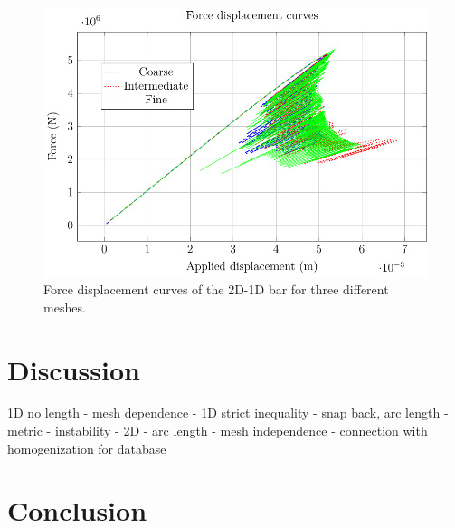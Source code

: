 \documentclass[11pt]{elsarticle}
\begin{document}
\begin{figure}[ht]
	\centering
	\includegraphics{./Images/L/force_displacement.pdf}
	\caption{Force displacement curves of the 2D-1D bar for three different meshes.}
	\label{L_force_displacement}
\end{figure}

\section{Discussion}

1D no length - mesh dependence - 1D strict inequality - snap back, arc length - metric - instability - 2D - arc length - mesh independence - connection with homogenization for database

\section{Conclusion}



\appendix
\end{document}
